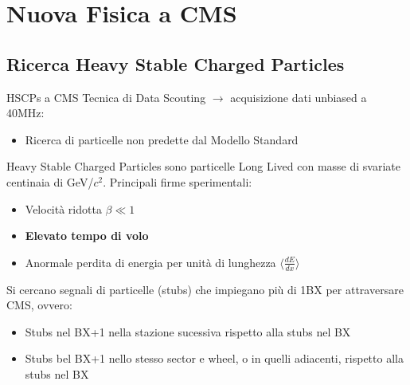 \documentclass{beamer}
\begin{document}





\section{Nuova Fisica a CMS}
\subsection{Ricerca Heavy Stable Charged Particles}

\begin{frame}{HSCPs a CMS}
    Tecnica di Data Scouting $\rightarrow$ acquisizione dati unbiased a 40MHz:
    \begin{itemize}
        \item Ricerca di particelle non predette dal Modello Standard
    \end{itemize}

    \vspace{0.3 cm}
    
    Heavy Stable Charged Particles sono particelle Long Lived con masse di svariate centinaia di GeV/$c^2$. Principali firme sperimentali:
    \begin{itemize}
        \item Velocità ridotta $\beta \ll 1$
        \item \textbf{Elevato tempo di volo}
        \item Anormale perdita di energia per unità di lunghezza $\langle \frac{dE}{dx}\rangle$
    \end{itemize}

    \vspace{0.3 cm}

    Si cercano segnali di particelle (stubs) che impiegano più di 1BX per attraversare CMS, ovvero:
    \begin{itemize}
        \item Stubs nel BX+1 nella stazione sucessiva rispetto alla stubs nel BX
        \item Stubs bel BX+1 nello stesso sector e wheel, o in quelli adiacenti, rispetto alla stubs nel BX
    \end{itemize}
\end{frame}
\end{document}
